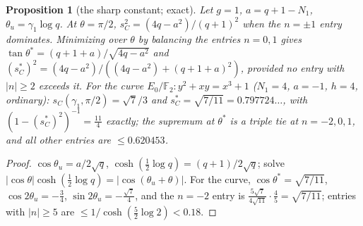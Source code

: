 \documentclass[11pt]{amsart}
\newtheorem{proposition}[theorem]{Proposition}
\theoremstyle{definition}
\theoremstyle{remark}
\newcommand{\F}{\mathbb F}
\begin{document}
\begin{proposition}[the sharp constant; exact]\label{prop:sC}
Let $g=1$, $a=q+1-N_1$, $\theta_u=\gamma_1\log q$. At $\theta=\pi/2$, $s_C^2=(4q-a^2)/(q+1)^2$ when the $n=\pm1$ entry
dominates. Minimizing over $\theta$ by balancing the entries $n=0,1$ gives
$\tan\theta^*=(q+1+a)/\sqrt{4q-a^2}$ and $(s_C^*)^2=(4q-a^2)/((4q-a^2)+(q+1+a)^2)$, provided no entry with
$|n|\ge2$ exceeds it. For the curve $E_0/\F_2:y^2+xy=x^3+1$ ($N_1=4$, $a=-1$, $h=4$, ordinary): $s_C(\gamma_1,\pi/2)=\sqrt7/3$ and
$s_C^*=\sqrt{7/11}=0.797724\ldots$, with $(1-(s_C^*)^2)^{-1}=\frac{11}4$ exactly; the supremum at $\theta^*$ is a triple tie at
$n=-2,0,1$, and all other entries are $\le0.620453$.
\end{proposition}
\begin{proof}
$\cos\theta_u=a/2\sqrt q$, $\cosh(\frac12\log q)=(q+1)/2\sqrt q$; solve $|\cos\theta|\cosh(\frac12\log q)=|\cos(\theta_u+\theta)|$.
For the curve, $\cos\theta^*=\sqrt{7/11}$, $\cos2\theta_u=-\frac34$, $\sin2\theta_u=-\frac{\sqrt7}4$, and the $n=-2$ entry is
$\frac{5\sqrt7}{4\sqrt{11}}\cdot\frac45=\sqrt{7/11}$; entries with $|n|\ge5$ are $\le1/\cosh(\frac52\log2)<0.18$.
\end{proof}
\end{document}
